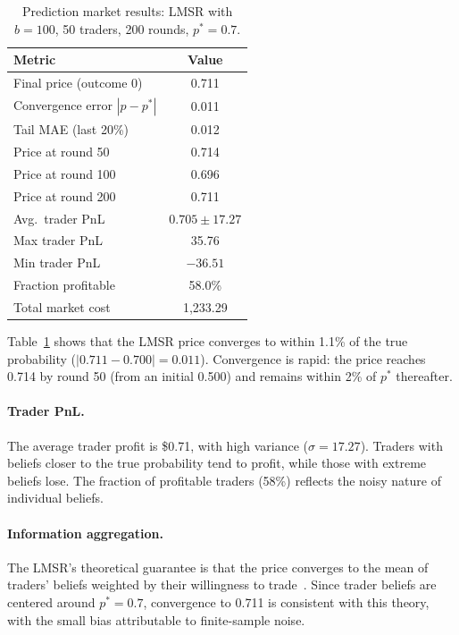 \documentclass[10pt]{article}
\begin{document}
\begin{table}[t]
\centering
\caption{Prediction market results: LMSR with $b=100$, 50 traders, 200 rounds, $p^*=0.7$.}
\label{tab:prediction}
\begin{tabular}{lc}
\toprule
\textbf{Metric} & \textbf{Value} \\
\midrule
Final price (outcome 0) & 0.711 \\
Convergence error $|p - p^*|$ & 0.011 \\
Tail MAE (last 20\%) & 0.012 \\
Price at round 50 & 0.714 \\
Price at round 100 & 0.696 \\
Price at round 200 & 0.711 \\
\midrule
Avg.\ trader PnL & $0.705 \pm 17.27$ \\
Max trader PnL & 35.76 \\
Min trader PnL & $-36.51$ \\
Fraction profitable & 58.0\% \\
Total market cost & 1{,}233.29 \\
\bottomrule
\end{tabular}
\end{table}

Table~\ref{tab:prediction} shows that the LMSR price converges to within 1.1\% of the true probability ($|0.711 - 0.700| = 0.011$). Convergence is rapid: the price reaches 0.714 by round 50 (from an initial 0.500) and remains within 2\% of $p^*$ thereafter.

\paragraph{Trader PnL.}
The average trader profit is \$0.71, with high variance ($\sigma = 17.27$). Traders with beliefs closer to the true probability tend to profit, while those with extreme beliefs lose. The fraction of profitable traders (58\%) reflects the noisy nature of individual beliefs.

\paragraph{Information aggregation.}
The LMSR's theoretical guarantee is that the price converges to the mean of traders' beliefs weighted by their willingness to trade~\citep{hanson2003combinatorial}. Since trader beliefs are centered around $p^* = 0.7$, convergence to 0.711 is consistent with this theory, with the small bias attributable to finite-sample noise.
\end{document}

